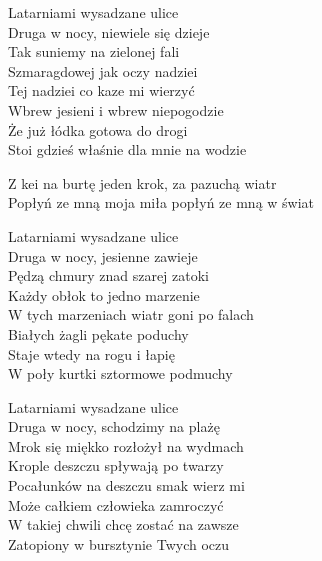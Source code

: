 \begin{text}
    Latarniami wysadzane ulice\\
    Druga w nocy, niewiele się dzieje\\
    Tak suniemy na zielonej fali\\
    Szmaragdowej jak oczy nadziei\\
    \vin Tej nadziei co kaze mi wierzyć\\
    \vin Wbrew jesieni i wbrew niepogodzie\\
    \vin Że już łódka gotowa do drogi\\
    \vin Stoi gdzieś właśnie dla mnie na wodzie

    Z kei na burtę jeden krok, za pazuchą wiatr\\
    Popłyń ze mną moja miła popłyń ze mną w świat

    Latarniami wysadzane ulice\\
    Druga w nocy, jesienne zawieje\\
    Pędzą chmury znad szarej zatoki\\
    Każdy obłok to jedno marzenie\\
    \vin W tych marzeniach wiatr goni po falach\\
    \vin Białych żagli pękate poduchy\\
    \vin Staje wtedy na rogu i łapię\\
    \vin W poły kurtki sztormowe podmuchy

    Latarniami wysadzane ulice\\
    Druga w nocy, schodzimy na plażę\\
    Mrok się miękko rozłożył na wydmach\\
    Krople deszczu spływają po twarzy\\
    \vin Pocałunków na deszczu smak wierz mi\\
    \vin Może całkiem człowieka zamroczyć\\
    \vin W takiej chwili chcę zostać na zawsze\\
    \vin Zatopiony w bursztynie Twych oczu
\end{text}
\begin{chord}

\end{chord}